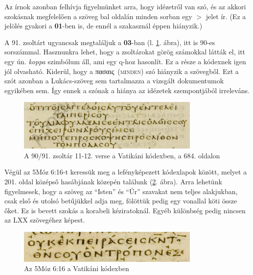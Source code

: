 \documentclass{article}
\newcommand\gr{\selectlanguage{greek}\frenchspacing}
\newcommand\hu{\selectlanguage{magyar}\frenchspacing}
\begin{document}
Az írnok azonban felhívja figyelmünket arra, hogy idézetről van szó, és az akkori
szokásnak megfelelően a szöveg bal oldalán minden sorban egy $>$ jelet ír. (Ez a jelölés
gyakori a \textbf{01}-ben is, de ennél a szakasznál éppen hiányzik.)

A 91. zsoltárt ugyancsak megtaláljuk a \textbf{03}-ban (l. \ref{03-Ps90:11-12}. ábra),
itt is 90-es sorszámmal. Hasznunkra
lehet, hogy a zsoltárokat görög számokkal látták el, itt egy ún. \textit{koppa} szimbólum áll, ami
egy q-hoz hasonlít. Ez a része a kódexnek igen jól olvasható. Kiderül, hogy a \gr πασαις\hu\ (\textsc{minden}) szó
hiányzik a szövegből. Ezt a szót azonban a Lukács-szöveg sem tartalmazza a vizsgált
dokumentumok egyikében sem. Így ennek a szónak a hiánya az idézetek szempontjából irreleváns.

\begin{figure}
\begin{center}
\includegraphics[width=0.8\textwidth]{../common/03_684lt-Ps90:11-12}
\caption{A 90/91. zsoltár 11-12. verse a Vatikáni kódexben, a 684. oldalon}
\label{03-Ps90:11-12}
\end{center}
\end{figure}

Végül az 5Móz 6:16-t keressük meg a lefényképezett kódexlapok között, melyet a 201. oldal
középső hasábjának közepén találunk (\ref{03-Deut6:16}. ábra). Arra lehetünk figyelmesek,
hogy a szöveg az ``Isten'' és ``Úr'' szavakat nem teljes alakjukban, csak első és utolsó
betűjükkel adja meg, fölöttük pedig egy vonallal köti össze őket. Ez is bevett szokás
a korabeli kéziratoknál. Egyéb különbség pedig nincsen az LXX szövegéhez képest.

\begin{figure}
\begin{center}
\includegraphics[width=0.8\textwidth]{../common/03_201mc-Deut6:16}
\caption{Az 5Móz 6:16 a Vatikáni kódexben}
\label{03-Deut6:16}
\end{center}
\end{figure}
\end{document}
